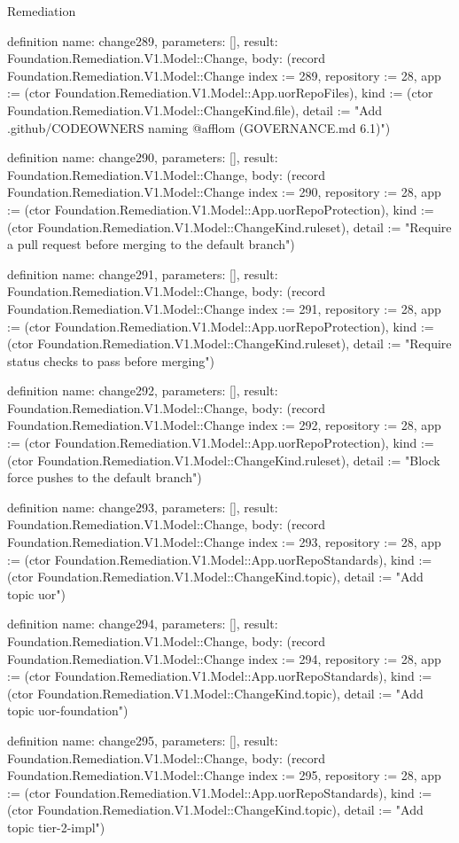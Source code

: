 \begin{lexlean}{Remediation}
\begin{semanticmodule}
definition{
  name: change289,
  parameters: [],
  result: Foundation.Remediation.V1.Model::Change,
  body: (record Foundation.Remediation.V1.Model::Change {index := 289, repository := 28, app := (ctor Foundation.Remediation.V1.Model::App.uorRepoFiles), kind := (ctor Foundation.Remediation.V1.Model::ChangeKind.file), detail := "Add .github/CODEOWNERS naming @afflom (GOVERNANCE.md 6.1)"})
}

definition{
  name: change290,
  parameters: [],
  result: Foundation.Remediation.V1.Model::Change,
  body: (record Foundation.Remediation.V1.Model::Change {index := 290, repository := 28, app := (ctor Foundation.Remediation.V1.Model::App.uorRepoProtection), kind := (ctor Foundation.Remediation.V1.Model::ChangeKind.ruleset), detail := "Require a pull request before merging to the default branch"})
}

definition{
  name: change291,
  parameters: [],
  result: Foundation.Remediation.V1.Model::Change,
  body: (record Foundation.Remediation.V1.Model::Change {index := 291, repository := 28, app := (ctor Foundation.Remediation.V1.Model::App.uorRepoProtection), kind := (ctor Foundation.Remediation.V1.Model::ChangeKind.ruleset), detail := "Require status checks to pass before merging"})
}

definition{
  name: change292,
  parameters: [],
  result: Foundation.Remediation.V1.Model::Change,
  body: (record Foundation.Remediation.V1.Model::Change {index := 292, repository := 28, app := (ctor Foundation.Remediation.V1.Model::App.uorRepoProtection), kind := (ctor Foundation.Remediation.V1.Model::ChangeKind.ruleset), detail := "Block force pushes to the default branch"})
}

definition{
  name: change293,
  parameters: [],
  result: Foundation.Remediation.V1.Model::Change,
  body: (record Foundation.Remediation.V1.Model::Change {index := 293, repository := 28, app := (ctor Foundation.Remediation.V1.Model::App.uorRepoStandards), kind := (ctor Foundation.Remediation.V1.Model::ChangeKind.topic), detail := "Add topic uor"})
}

definition{
  name: change294,
  parameters: [],
  result: Foundation.Remediation.V1.Model::Change,
  body: (record Foundation.Remediation.V1.Model::Change {index := 294, repository := 28, app := (ctor Foundation.Remediation.V1.Model::App.uorRepoStandards), kind := (ctor Foundation.Remediation.V1.Model::ChangeKind.topic), detail := "Add topic uor-foundation"})
}

definition{
  name: change295,
  parameters: [],
  result: Foundation.Remediation.V1.Model::Change,
  body: (record Foundation.Remediation.V1.Model::Change {index := 295, repository := 28, app := (ctor Foundation.Remediation.V1.Model::App.uorRepoStandards), kind := (ctor Foundation.Remediation.V1.Model::ChangeKind.topic), detail := "Add topic tier-2-impl"})
}


\end{semanticmodule}
\end{lexlean}
